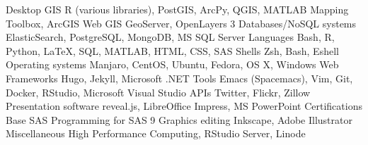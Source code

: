 \begin{cvtechskills}
    \cvtechskill    
        {Desktop GIS}
        {R (various libraries), PostGIS, ArcPy, QGIS, MATLAB Mapping Toolbox, ArcGIS}
        {}
        {}
    \cvtechskill    
        {Web GIS}
        {GeoServer, OpenLayers 3}
        {}
        {}
    \cvtechskill    
        {Databases/NoSQL systems}
        {ElasticSearch, PostgreSQL, MongoDB, MS SQL Server}
        {}
        {}
    \cvtechskill    
        {Languages}
        {Bash, R, Python, LaTeX, SQL, MATLAB, HTML, CSS, SAS}
        {}
        {}
    \cvtechskill    
        {Shells}
        {Zsh, Bash, Eshell}
        {}
        {}
    \cvtechskill    
        {Operating systems}
        {Manjaro, CentOS, Ubuntu, Fedora, OS X, Windows}
        {}
        {}  
    \cvtechskill    
        {Web Frameworks}
        {Hugo, Jekyll, Microsoft .NET}
        {}
        {}  
    \cvtechskill
        {Tools}
        {Emacs (Spacemacs), Vim, Git, Docker, RStudio, Microsoft Visual Studio}
        {}
        {}
    \cvtechskill    
        {APIs}
        {Twitter, Flickr, Zillow}
        {}
        {}
    \cvtechskill    
        {Presentation software}
        {reveal.js, LibreOffice Impress, MS PowerPoint}
        {}
        {}
    \cvtechskill
        {Certifications}
        {Base SAS Programming for SAS 9}
        {}
        {}
    \cvtechskill
        {Graphics editing}
        {Inkscape, Adobe Illustrator}
        {}
        {}
    \cvtechskill
        {Miscellaneous}
        {High Performance Computing, RStudio Server, Linode}
        {}
        {}
\end{cvtechskills}